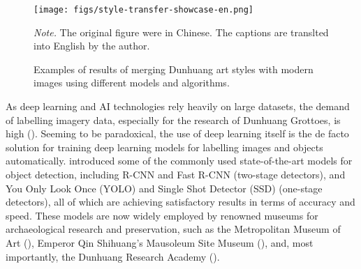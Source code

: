 \begin{figure}
    \caption{Examples of results of merging Dunhuang art styles with modern images using different 
    models and algorithms.}
    \label{fig:style-transfer-showcase}
    
    \begin{center}
        \texttt{[image: figs/style-transfer-showcase-en.png]}
    \end{center}

    \small\textit{Note.} The original figure were in Chinese. The captions are translted into English
    by the author. 
\end{figure}

As deep learning and AI technologies rely heavily on large datasets, the demand of labelling imagery data,
especially for the research of Dunhuang Grottoes, is high ().
Seeming to be paradoxical, the use of deep learning itself is the de facto solution for training deep learning
models for labelling images and objects automatically. 
introduced some of the commonly used state-of-the-art models for object detection, including R-CNN and Fast R-CNN
(two-stage detectors), and You Only Look Once (YOLO) and Single Shot Detector (SSD) (one-stage detectors),
all of which are achieving satisfactory results in terms of accuracy and speed.
These models are now widely employed by renowned museums for archaeological research and preservation, such
as the Metropolitan Museum of Art (),
Emperor Qin Shihuang's Mausoleum Site Museum (),
and, most importantly, the Dunhuang Research Academy ().

\printbibliography